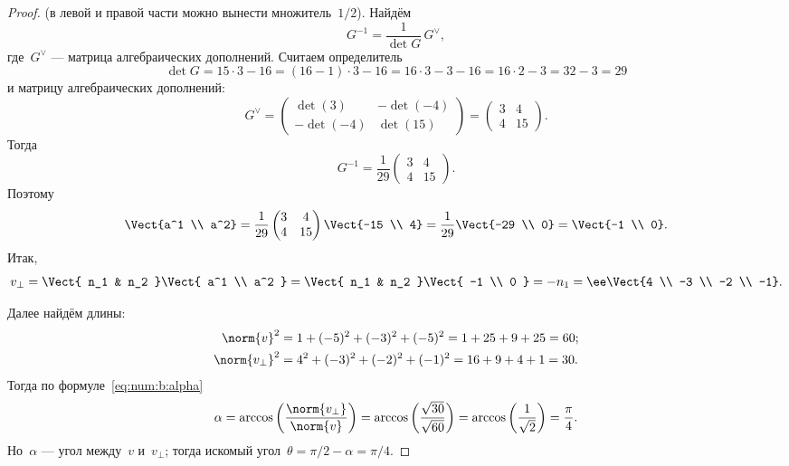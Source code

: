 \begin{proof}
	(в левой и правой части можно вынести множитель~$1/2$). Найдём
	\[
		G^{-1} =
		\frac{1}{\det{G}}\,G^\vee,
	\]
	где~$G^\vee$ --- матрица алгебраических дополнений. Считаем определитель
	\[
		\det{G} =
		15 \cdot 3 - 16 =
		(16-1) \cdot 3 - 16
		=
		16 \cdot 3 - 3 - 16 =
		16 \cdot 2 - 3 =
		32 - 3 = 29
	\]
	и матрицу алгебраических дополнений:
	\[
		G^\vee
		=
		\begin{pmatrix}
			\det(3) & -\det(-4) \\
			-\det(-4) & \det(15)
		\end{pmatrix}
		=
		\begin{pmatrix}
			3 & 4 \\
			4 & 15
		\end{pmatrix}
		.
	\]
	Тогда
	\[
		G^{-1}
		=
		\frac{1}{29}
		\begin{pmatrix}
			3 & 4 \\
			4 & 15
		\end{pmatrix}
		.
	\]
	Поэтому
	\[
		\Vect{a^1 \\ a^2} =
		\frac{1}{29}
		\begin{pmatrix}
			3 & 4 \\
			4 & 15
		\end{pmatrix}
		\Vect{-15 \\ 4}
		=
		\frac{1}{29}
		\Vect{-29 \\ 0}
		=
		\Vect{-1 \\ 0}
		.
	\]
	Итак,
	\[
		v_\bot =
		\Vect{
			n_1 & n_2
		}
		\Vect{
			a^1 \\ a^2
		}
		=
		\Vect{
			n_1 & n_2
		}
		\Vect{ -1 \\ 0 }
		=
		-n_1
		=
		\ee
		\Vect{4 \\ -3 \\ -2 \\ -1}
		.
	\]

	Далее найдём длины:
	\begin{align*}
		\norm{v}^2 &=
		1 + (-5)^2 + (-3)^2 + (-5)^2 =
		1 + 25 + 9 + 25 = 60;
		\\
		\norm{v_\bot}^2 &=
		4^2 + (-3)^2 + (-2)^2 + (-1)^2 =
		16 + 9 + 4 + 1 =
		30.
	\end{align*}
	Тогда по формуле~\eqref{eq:num:b:alpha}
	\[
		\alpha =
		\arccos
		\left( 
			\frac{\norm{v_\bot}}{\norm{v}}
		\right)
		=
		\arccos
		\left( 
			\frac{\sqrt{30}}{\sqrt{60}}
		\right)
		=
		\arccos
		\left( 
			\frac{1}{\sqrt{2}}
		\right)
		=
		\frac{\pi}{4}
		.
	\]
	Но~$\alpha$ --- угол между~$v$ и~$v_\bot$; тогда искомый угол~$\theta = \pi/2 - \alpha = \pi/4$.
\end{proof}

